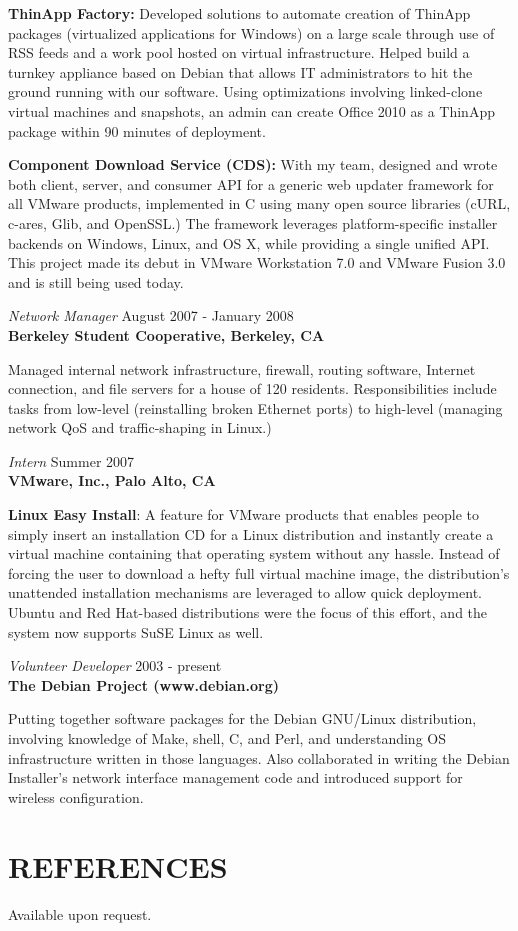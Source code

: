 \documentclass[overlapped,line,margin]{res}
\begin{document}
\begin{resume}
  \textbf{ThinApp Factory:} Developed solutions to automate creation of
  ThinApp packages (virtualized applications for Windows) on a large scale
  through use of RSS feeds and a work pool hosted on virtual infrastructure.
  Helped build a turnkey appliance based on Debian that allows IT
  administrators to hit the ground running with our software. Using
  optimizations involving linked-clone virtual machines and snapshots, an admin
  can create Office 2010 as a ThinApp package within 90 minutes of deployment.

  \textbf{Component Download Service (CDS):} With my team, designed and wrote
  both client, server, and consumer API for a generic web updater framework for
  all VMware products, implemented in C using many open source libraries (cURL,
  c-ares, Glib, and OpenSSL.) The framework leverages platform-specific
  installer backends on Windows, Linux, and OS X, while providing a single
  unified API. This project made its debut in VMware Workstation 7.0 and VMware
  Fusion 3.0 and is still being used today.

{\sl Network Manager} \hfill August 2007 - January 2008 \\
\textbf{Berkeley Student Cooperative, Berkeley, CA}

  Managed internal network infrastructure, firewall, routing
  software, Internet connection, and file servers for a house of 120 residents.
  Responsibilities include tasks from low-level (reinstalling broken Ethernet
  ports) to high-level (managing network QoS and traffic-shaping in Linux.)

{\sl Intern} \hfill Summer 2007 \\
\textbf{VMware, Inc., Palo Alto, CA}

  \textbf{Linux Easy Install}: A feature for VMware products that enables people
  to simply insert an installation CD for a Linux distribution and instantly
  create a virtual machine containing that operating system without any hassle.
  Instead of forcing the user to download a hefty full virtual machine image,
  the distribution's unattended installation mechanisms are leveraged to allow
  quick deployment. Ubuntu and Red Hat-based distributions were the focus of
  this effort, and the system now supports SuSE Linux as well.

{\sl Volunteer Developer} \hfill 2003 - present \\
\textbf{The Debian Project (www.debian.org)}

  Putting together software packages for the Debian GNU/Linux distribution,
  involving knowledge of Make, shell, C, and Perl, and understanding OS
  infrastructure written in those languages. Also collaborated in writing the
  Debian Installer's network interface management code and introduced support
  for wireless configuration.

\section{REFERENCES} Available upon request.

\end{resume}
\end{document}
